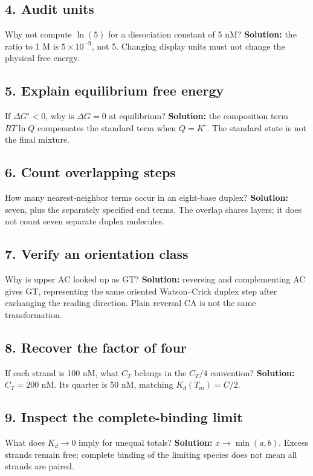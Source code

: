 \subsection*{4. Audit units}
Why not compute $\ln(5)$ for a dissociation constant of 5 nM?
\textbf{Solution:} the ratio to 1 M is $5\times10^{-9}$, not 5.
Changing display units must not change the physical free energy.

\subsection*{5. Explain equilibrium free energy}
If $\Delta G^\circ<0$, why is $\Delta G=0$ at equilibrium?
\textbf{Solution:} the composition term $RT\ln Q$ compensates the standard
term when $Q=K^\circ$. The standard state is not the final mixture.

\subsection*{6. Count overlapping steps}
How many nearest-neighbor terms occur in an eight-base duplex?
\textbf{Solution:} seven, plus the separately specified end terms.
The overlap shares layers; it does not count seven separate duplex molecules.

\subsection*{7. Verify an orientation class}
Why is upper AC looked up as GT?
\textbf{Solution:} reversing and complementing AC gives GT, representing
the same oriented Watson--Crick duplex step after exchanging the reading direction.
Plain reversal CA is not the same transformation.

\subsection*{8. Recover the factor of four}
If each strand is 100 nM, what $C_T$ belongs in the $C_T/4$ convention?
\textbf{Solution:} $C_T=200$ nM. Its quarter is 50 nM, matching
$K_d(T_m)=C/2$.

\subsection*{9. Inspect the complete-binding limit}
What does $K_d\to0$ imply for unequal totals?
\textbf{Solution:} $x\to\min(a,b)$. Excess strands remain free;
complete binding of the limiting species does not mean all strands are paired.

